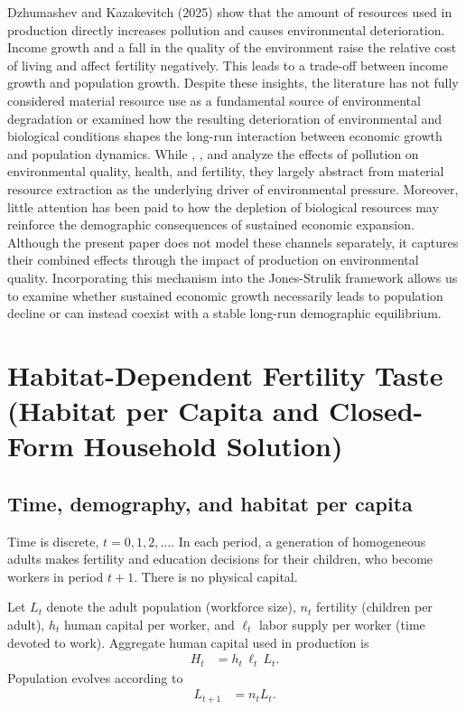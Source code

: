 \documentclass[11pt]{article}
\begin{document}
Dzhumashev  and Kazakevitch (2025) show that the amount of resources used in production directly increases pollution and causes environmental deterioration. Income growth and a fall in the quality of the environment raise the relative cost of living and affect fertility negatively. This leads to a trade-off between income growth and population growth. Despite these insights, the literature has not fully considered material resource use as a fundamental source of environmental degradation or examined how the resulting deterioration of environmental and biological conditions shapes the long-run interaction between economic growth and population dynamics. While \citet{Varvarigos2013}, \citet{pautrel08}, and \citet{mar2017} analyze the effects of pollution on environmental quality, health, and fertility, they largely abstract from material resource extraction as the underlying driver of environmental pressure. Moreover, little attention has been paid to how the depletion of biological resources may reinforce the demographic consequences of sustained economic expansion. Although the present paper does not model these channels separately, it captures their combined effects through the impact of production on environmental quality. Incorporating this mechanism into the Jones-Strulik framework allows us to examine whether sustained economic growth necessarily leads to population decline or can instead coexist with a stable long-run demographic equilibrium.




\section{Habitat-Dependent Fertility Taste (Habitat per Capita and Closed-Form Household Solution)}
\label{sec:habitat_taste}
\subsection{Time, demography, and habitat per capita}
Time is discrete, $t=0,1,2,\dots$. In each period, a generation of homogeneous adults makes fertility and education decisions for
their children, who become workers in period $t+1$. There is no physical capital.

Let $L_t$ denote the adult population (workforce size), $n_t$ fertility (children per adult), $h_t$ human capital per worker, and
$\ell_t$ labor supply per worker (time devoted to work). Aggregate human capital used in production is
\begin{align}
H_t &= h_t \,\ell_t\, L_t. \label{eq:Hagg_hab}
\end{align}
Population evolves according to
\begin{align}
L_{t+1} &= n_t L_t. \label{eq:Llaw_hab}
\end{align}
\end{document}
